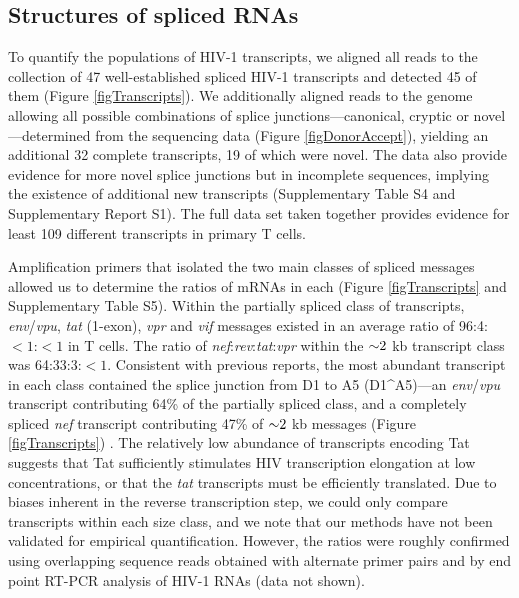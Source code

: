 \documentclass[../sherrill-Mix_thesis.tex]{subfiles}
\begin{document}
\subsection{Structures of spliced \hivEight{} RNAs}
To quantify the populations of HIV-1 transcripts, we aligned all reads to the collection of 47 well-established spliced HIV-1 transcripts and detected 45 of them (Figure \ref{figTranscripts}). We additionally aligned reads to the \hivEight{} genome allowing all possible combinations of splice junctions---canonical, cryptic or novel---determined from the sequencing data (Figure \ref{figDonorAccept}), yielding an additional 32 complete transcripts, 19 of which were novel. The data also provide evidence for more novel splice junctions but in incomplete sequences, implying the existence of additional new transcripts (Supplementary Table S4 and Supplementary Report S1). The full data set taken together provides evidence for least 109 different \hivEight{} transcripts in primary T cells.

Amplification primers that isolated the two main classes of spliced messages allowed us to determine the ratios of mRNAs in each (Figure \ref{figTranscripts} and Supplementary Table S5). Within the partially spliced class of transcripts, \textit{env}/\textit{vpu}, \textit{tat} (1-exon), \textit{vpr} and \textit{vif} messages existed in an average ratio of 96:4:$<1$:$<1$ in \cdFour{} T cells. The ratio of \textit{nef}:\textit{rev}:\textit{tat}:\textit{vpr} within the $\mathord{\sim}{}2$ kb transcript class was 64:33:3:$<1$. Consistent with previous reports, the most abundant transcript in each class contained the splice junction from D1 to A5 (D1\^{}A5)---an \textit{env}/\textit{vpu} transcript contributing 64\% of the partially spliced class, and a completely spliced \textit{nef} transcript contributing 47\% of $\mathord{\sim}{}2$ kb messages (Figure \ref{figTranscripts}) \citep{Purcell1993,Guatelli1990}. The relatively low abundance of transcripts encoding Tat suggests that Tat sufficiently stimulates HIV transcription elongation at low concentrations, or that the \textit{tat} transcripts must be efficiently translated. Due to biases inherent in the reverse transcription step, we could only compare transcripts within each size class, and we note that our methods have not been validated for empirical quantification. However, the ratios were roughly confirmed using overlapping sequence reads obtained with alternate primer pairs and by end point RT-PCR analysis of HIV-1 RNAs (data not shown).
\end{document}
